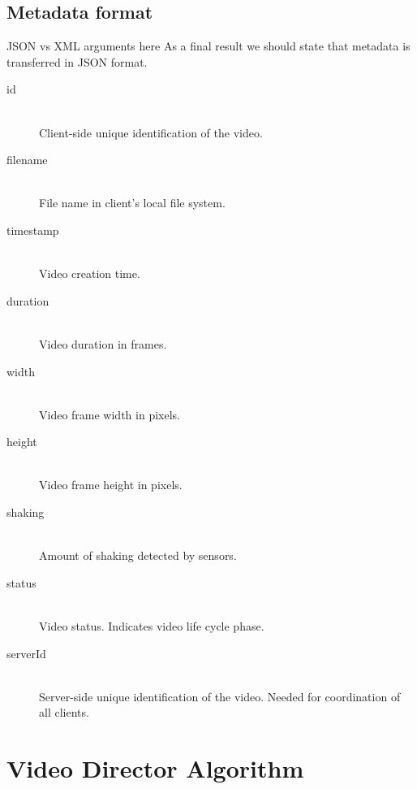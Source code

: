 \documentclass[conference]{IEEEtran}
\begin{document}
\subsection{Metadata format}
JSON vs XML arguments here
As a final result we should state that metadata is transferred in JSON format.
\begin{description}
	\item[id]\hfill\\
		Client-side unique identification of the video.
		
	\item[filename]\hfill\\
		File name in client's local file system.
		
	\item[timestamp]\hfill\\
		Video creation time.
		
	\item[duration]\hfill\\
		Video duration in frames.
		
	\item[width]\hfill\\
		Video frame width in pixels.

	\item[height]\hfill\\
		Video frame height in pixels.		
	
	\item[shaking]\hfill\\
		Amount of shaking detected by sensors.
	
	\item[status]\hfill\\
		Video status. Indicates video life cycle phase.
	
	\item[serverId]\hfill\\
		Server-side unique identification of the video. Needed for coordination of all clients.
		
\end{description}

\section{Video Director Algorithm}
\end{document}
